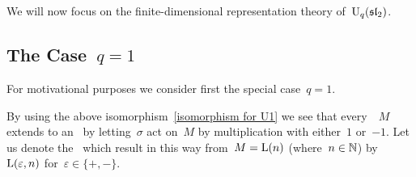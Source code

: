 \documentclass[a4paper, 11pt, oneside]{scrartcl}
\begin{document}
We will now focus on the finite-dimensional representation theory of~$\operatorname{U}_q(\mathfrak{sl}_2)$.



\subsection{The Case~\texorpdfstring{$q = 1$}{q=1}}
\label{representation theory of quantum U1}

For motivational purposes we consider first the special case~$q = 1$.

By using the above isomorphism~\eqref{isomorphism for U1} we see that every~~$M$ extends to an~ by letting~$\sigma$ act on~$M$ by multiplication with either~$1$ or~$-1$.
Let us denote the~ which result in this way from~$M = \operatorname{L}(n)$ (where~$n \in \mathbb{N}$) by~$\operatorname{L}(\varepsilon, n)$ for~$\varepsilon \in \{+, -\}$.
\end{document}
